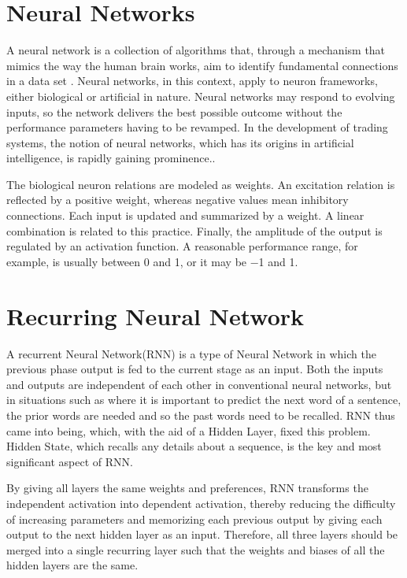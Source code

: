 \documentclass[
]{thesis-ekf}
\begin{document}
\section{Neural Networks}
A neural network is a collection of algorithms that, through a mechanism that mimics the way the human brain works, aim to identify fundamental connections in a data set \cite{jain1999recurrent}.  Neural networks, in this context, apply to neuron frameworks, either biological or artificial in nature. Neural networks may respond to evolving inputs, so the network delivers the best possible outcome without the performance parameters having to be revamped. In the development of trading systems, the notion of neural networks, which has its origins in artificial intelligence, is rapidly gaining prominence.\citealp*{krose1993introduction}.


The biological neuron relations are modeled as weights. An excitation relation is reflected by a positive weight, whereas negative values mean inhibitory connections. Each input is updated and summarized by a weight. A linear combination is related to this practice. Finally, the amplitude of the output is regulated by an activation function. A reasonable performance range, for example, is usually between 0 and 1, or it may be −1 and 1.

\section{Recurring Neural Network}

A recurrent Neural Network(RNN) is a type of Neural Network in which the previous phase output is fed to the current stage as an input. Both the inputs and outputs are independent of each other in conventional neural networks, but in situations such as where it is important to predict the next word of a sentence, the prior words are needed and so the past words need to be recalled. RNN thus came into being, which, with the aid of a Hidden Layer, fixed this problem. Hidden State, which recalls any details about a sequence, is the key and most significant aspect of RNN.\cite{jain1999recurrent}

By giving all layers the same weights and preferences, RNN transforms the independent activation into dependent activation, thereby reducing the difficulty of increasing parameters and memorizing each previous output by giving each output to the next hidden layer as an input.
Therefore, all three layers should be merged into a single recurring layer such that the weights and biases of all the hidden layers are the same.
\end{document}
